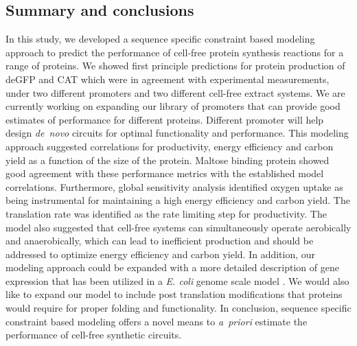 \documentclass[journal=asbcd6,manuscript=article]{achemso}
\begin{document}


\subsection{Summary and conclusions}
In this study, we developed a sequence specific constraint based modeling approach to predict the performance of cell-free protein synthesis reactions for a range of proteins. We showed first principle predictions for protein production of deGFP and CAT which were in agreement with experimental measurements, under two different promoters and two different cell-free extract systems.
We are currently working on expanding our library of promoters that can provide good estimates of performance for different proteins.
Different promoter will help design \emph{de~novo} circuits for optimal functionality and performance.
This modeling approach suggested correlations for productivity, energy efficiency and carbon yield as a function of the size of the protein.
Maltose binding protein showed good agreement with these performance metrics with the established model correlations.
Furthermore, global sensitivity analysis identified oxygen uptake as being instrumental for maintaining a high energy efficiency and carbon yield.
The translation rate was identified as the rate limiting step for productivity.
The model also suggested that cell-free systems can simultaneously operate aerobically and anaerobically, which can lead to inefficient production and should be addressed to optimize energy efficiency and carbon yield.
In addition, our modeling approach could be expanded with a more detailed description of gene expression that has been utilized in a \emph{E. coli} genome scale model \cite{Brien693}.
We would also like to expand our model to include post translation modifications that proteins would require for proper folding and functionality.
In conclusion, sequence specific constraint based modeling offers a novel means to \emph{a~priori} estimate the performance of cell-free synthetic circuits.
\end{document}
